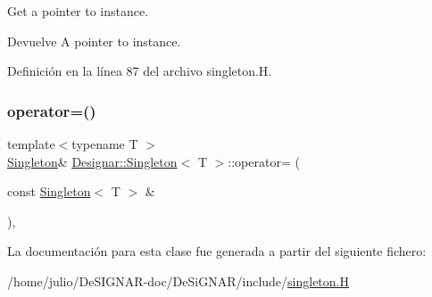 Get a pointer to instance.

\begin{DoxyReturn}{Devuelve}
A pointer to instance. 
\end{DoxyReturn}


Definición en la línea 87 del archivo singleton.\+H.

\mbox{\label{class_designar_1_1_singleton_a8968c625d740c01211ec483142e52a58}} 
\subsubsection{\texorpdfstring{operator=()}{operator=()}}
{\footnotesize\ttfamily template$<$typename T $>$ \\
\hyperlink{class_designar_1_1_singleton}{Singleton}\& \hyperlink{class_designar_1_1_singleton}{Designar\+::\+Singleton}$<$ T $>$\+::operator= (\begin{DoxyParamCaption}\item[{const \hyperlink{class_designar_1_1_singleton}{Singleton}$<$ T $>$ \&}]{ }\end{DoxyParamCaption})\hspace{0.3cm}{\ttfamily [protected]}, {\ttfamily [delete]}}



La documentación para esta clase fue generada a partir del siguiente fichero\+:\begin{DoxyCompactItemize}
\item 
/home/julio/\+De\+S\+I\+G\+N\+A\+R-\/doc/\+De\+Si\+G\+N\+A\+R/include/\hyperlink{singleton_8_h}{singleton.\+H}\end{DoxyCompactItemize}
